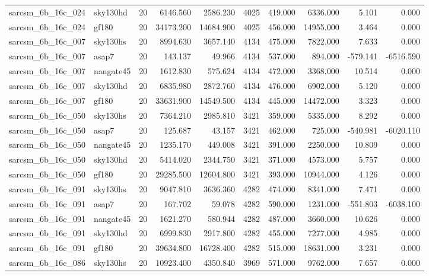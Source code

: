 \begin{tabular}{llrrrrrrrr}
sarcsm\_6b\_16c\_024 & sky130hd & 20 & 6146.560 & 2586.230 & 4025 & 419.000 & 6336.000 & 5.101 & 0.000 \\
sarcsm\_6b\_16c\_024 & gf180 & 20 & 34173.200 & 14684.900 & 4025 & 456.000 & 14955.000 & 3.464 & 0.000 \\
sarcsm\_6b\_16c\_007 & sky130hs & 20 & 8994.630 & 3657.140 & 4134 & 475.000 & 7822.000 & 7.633 & 0.000 \\
sarcsm\_6b\_16c\_007 & asap7 & 20 & 143.137 & 49.966 & 4134 & 537.000 & 894.000 & -579.141 & -6516.590 \\
sarcsm\_6b\_16c\_007 & nangate45 & 20 & 1612.830 & 575.624 & 4134 & 472.000 & 3368.000 & 10.514 & 0.000 \\
sarcsm\_6b\_16c\_007 & sky130hd & 20 & 6835.980 & 2872.760 & 4134 & 476.000 & 6902.000 & 5.120 & 0.000 \\
sarcsm\_6b\_16c\_007 & gf180 & 20 & 33631.900 & 14549.500 & 4134 & 445.000 & 14472.000 & 3.323 & 0.000 \\
sarcsm\_6b\_16c\_050 & sky130hs & 20 & 7364.210 & 2985.810 & 3421 & 359.000 & 5335.000 & 8.292 & 0.000 \\
sarcsm\_6b\_16c\_050 & asap7 & 20 & 125.687 & 43.157 & 3421 & 462.000 & 725.000 & -540.981 & -6020.110 \\
sarcsm\_6b\_16c\_050 & nangate45 & 20 & 1235.170 & 449.008 & 3421 & 391.000 & 2250.000 & 10.809 & 0.000 \\
sarcsm\_6b\_16c\_050 & sky130hd & 20 & 5414.020 & 2344.750 & 3421 & 371.000 & 4573.000 & 5.757 & 0.000 \\
sarcsm\_6b\_16c\_050 & gf180 & 20 & 29285.500 & 12604.800 & 3421 & 393.000 & 10944.000 & 4.126 & 0.000 \\
sarcsm\_6b\_16c\_091 & sky130hs & 20 & 9047.810 & 3636.360 & 4282 & 474.000 & 8341.000 & 7.471 & 0.000 \\
sarcsm\_6b\_16c\_091 & asap7 & 20 & 167.702 & 59.078 & 4282 & 590.000 & 1231.000 & -551.803 & -6038.100 \\
sarcsm\_6b\_16c\_091 & nangate45 & 20 & 1621.270 & 580.944 & 4282 & 487.000 & 3660.000 & 10.626 & 0.000 \\
sarcsm\_6b\_16c\_091 & sky130hd & 20 & 6999.830 & 2917.800 & 4282 & 455.000 & 7277.000 & 4.985 & 0.000 \\
sarcsm\_6b\_16c\_091 & gf180 & 20 & 39634.800 & 16728.400 & 4282 & 515.000 & 18631.000 & 3.231 & 0.000 \\
sarcsm\_6b\_16c\_086 & sky130hs & 20 & 10923.400 & 4350.840 & 3969 & 571.000 & 9762.000 & 7.657 & 0.000 \\

\end{tabular}
